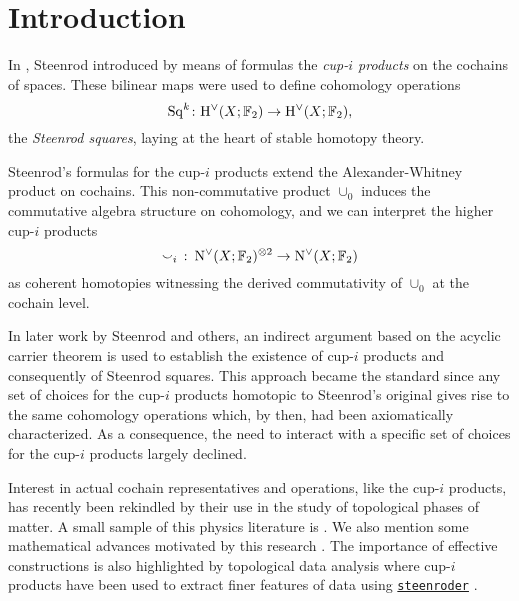 
\section{Introduction} \label{s:introduction}

In \cite{steenrod1947products}, Steenrod introduced by means of formulas the \textit{\mbox{cup-$i$} products} on the cochains of spaces.
These bilinear maps were used to define cohomology operations
\[
\mathrm{Sq}^k \colon \mathrm{H}^\vee(X; {\mathbb{F}_2}) \to \mathrm{H}^\vee(X; {\mathbb{F}_2}),
\]
the \textit{Steenrod squares}, laying at the heart of stable homotopy theory.

Steenrod's formulas for the \mbox{cup-$i$} products extend the Alexander-Whitney product on cochains.
This non-commutative product $\cup_0$ induces the commutative algebra structure on cohomology, and we can interpret the higher \mbox{cup-$i$} products
\[
\smallsmile_i\ \colon \operatorname{N^{\vee}}(X; {\mathbb{F}_2})^{\otimes 2} \to \operatorname{N^{\vee}}(X; {\mathbb{F}_2})
\]
as coherent homotopies witnessing the derived commutativity of $\cup_0$ at the cochain level.

In later work by Steenrod \cite{steenrod1962cohomology} and others, an indirect argument based on the acyclic carrier theorem is used to establish the existence of \mbox{cup-$i$} products and consequently of Steenrod squares.
This approach became the standard since any set of choices for the \mbox{cup-$i$} products homotopic to Steenrod's original gives rise to the same cohomology operations which, by then, had been axiomatically characterized.
As a consequence, the need to interact with a specific set of choices for the \mbox{cup-$i$} products largely declined.

Interest in actual cochain representatives and operations, like the \mbox{cup-$i$} products, has recently been rekindled by their use in the study of topological phases of matter.
A small sample of this physics literature is \cite{gaiotto2016spin, kapustin2017fermionic, meng2018classification, wang2020construction, barkeshli2021classification, tata2021anomalies, tata2021cubical}.
We also mention some mathematical advances motivated by this research \cite{brumfiel2016pontrjagin, brumfiel2018pontrjagin, medina2020cartan, medina2021adem}.
The importance of effective constructions is also highlighted by topological data analysis \cite{carlsson2005data} where cup-$i$ products have been used to extract finer features of data using \href{https://github.com/Steenroder/steenroder}{\texttt{steenroder}} \cite{medina2021per_st}.


